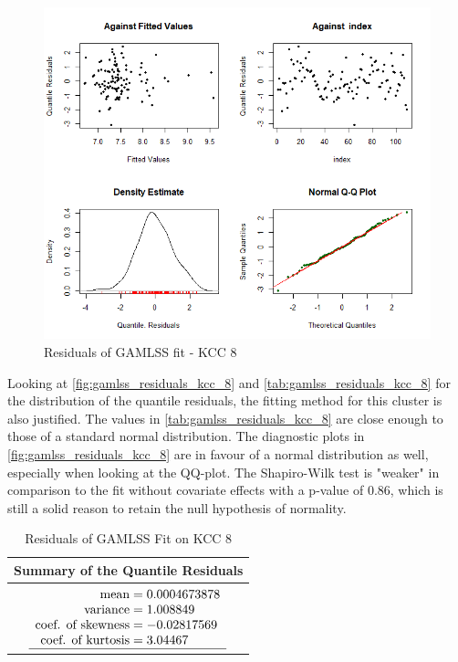 \begin{figure}[H]
\centering
  \includegraphics[width=0.95\linewidth]{figures/gamlss_residuals_kcc_8.png}
  \caption{Residuals of GAMLSS fit - KCC 8}
  \label{fig:gamlss_residuals_kcc_8}
\end{figure}






Looking at \autoref{fig:gamlss_residuals_kcc_8} and \autoref{tab:gamlss_residuals_kcc_8} for the distribution of the quantile residuals, the fitting method for this cluster is also justified. The values in \autoref{tab:gamlss_residuals_kcc_8} are close enough to those of a standard normal distribution. The diagnostic plots in \autoref{fig:gamlss_residuals_kcc_8} are in favour of a normal distribution as well, especially when looking at the QQ-plot. The Shapiro-Wilk test is "weaker" in comparison to the fit without covariate effects with a p-value of 0.86, which is still a solid reason to retain the null hypothesis of normality.
\\






\begin{table}[H]
\centering
\begin{tabular}{c}
\hline
\rowcolor{white} 
\textbf{Summary of the Quantile Residuals} \\ \hline\hline
 $\begin{array}[t]{ r @{{}={}} l }
\text{mean} & 0.0004673878                          \\ 
\text{variance} & 1.008849                          \\ 
\text{coef. of skewness} & -0.02817569              \\ 
\text{coef. of kurtosis} & 3.04467                 \\ \hline
\end{array}$
\end{tabular}
\caption{Residuals of GAMLSS Fit on KCC 8}
\label{tab:gamlss_residuals_kcc_8}
\end{table}





